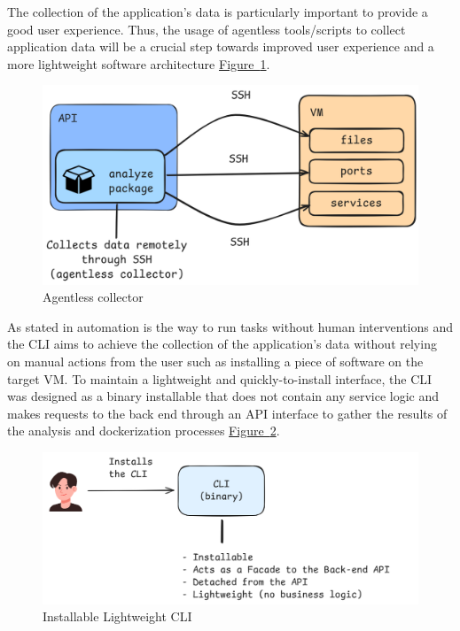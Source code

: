 \documentclass[twocolumn]{article}
\newcommand{\FigRef}[1]{\hyperref[#1]{Figure~\ref{#1}}}
\begin{document}
The collection of the application’s data is particularly important to provide a good user experience. Thus, the usage of agentless tools/scripts to collect application data will be a crucial step towards improved user experience and a more lightweight software architecture \FigRef{fig:agentless-collector}.

\begin{figure}[H]
    \centering
    \includegraphics[width=\linewidth]{images/agentless-collector.png}
    \caption{Agentless collector}
    \label{fig:agentless-collector}
\end{figure}

As stated in \cite{Elradi-2023} automation is the way to run tasks without human interventions and the CLI aims to achieve the collection of the application’s data without relying on manual actions from the user such as installing a piece of software on the target VM. To maintain a lightweight and quickly-to-install interface, the CLI was designed as a binary installable that does not contain any service logic and makes requests to the back end through an API interface to gather the results of the analysis and dockerization processes \FigRef{fig:installable-lightweight-cli}. 

\begin{figure}[H]
    \centering
    \includegraphics[width=\linewidth]{images/installable-lightweight-cli.png}
    \caption{Installable Lightweight CLI}
    \label{fig:installable-lightweight-cli}
\end{figure}
\end{document}
